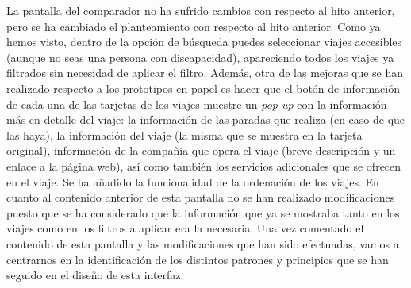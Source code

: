 La pantalla del comparador no ha sufrido cambios con respecto al hito anterior, pero se ha cambiado el planteamiento
con respecto al hito anterior. Como ya hemos visto, dentro de la opción de búsqueda puedes seleccionar viajes
accesibles (aunque no seas una persona con discapacidad), apareciendo todos los viajes ya filtrados sin necesidad
de aplicar el filtro. Además, otra de las mejoras que se han realizado respecto a los prototipos en papel es hacer
que el botón de información de cada una de las tarjetas de los viajes muestre un \textit{pop-up} con la información más en
detalle del viaje: la información de las paradas que realiza (en caso de que las haya), la información del viaje
(la misma que se muestra en la tarjeta original), información de la compañía que opera el viaje (breve descripción
y un enlace a la página web), así como también los servicios adicionales que se ofrecen en el viaje. Se ha añadido
la funcionalidad de la ordenación de los viajes. En cuanto al contenido anterior de esta pantalla no se han realizado
modificaciones puesto que se ha considerado que la información que ya se mostraba tanto en los viajes como en los
filtros a aplicar era la necesaria. Una vez comentado el contenido de esta pantalla y las modificaciones que han
sido efectuadas, vamos a centrarnos en la identificación de los distintos patrones y principios que se han seguido
en el diseño de esta interfaz:

